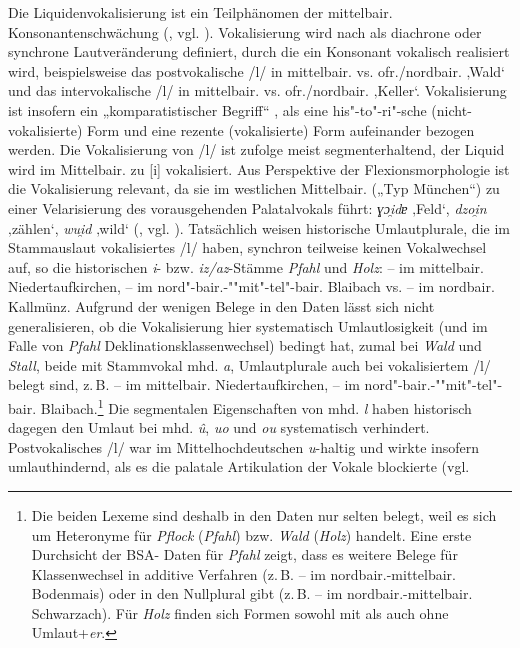 Die Liquidenvokalisierung ist ein Teilphänomen der mittelbair. Konsonantenschwächung (\citealt[49c6]{Kranzmayer1956}, vgl. \citealt[419]{Rowley1990b}). Vokalisierung wird nach \citet[1111]{Haas1983} als diachrone oder synchrone Lautveränderung definiert, durch die ein Konsonant vokalisch realisiert wird, beispielsweise das postvokalische /l/ in mittelbair.  vs. ofr./nordbair.  ‚Wald‘ und das intervokalische /l/ in mittelbair.  vs. ofr./nordbair.  ‚Keller‘. Vokalisierung ist insofern ein „komparatistischer Begriff“ \citep[1111]{Haas1983}, als eine his"-to"-ri"-sche (nicht-vokalisierte) Form und eine rezente (vokalisierte) Form aufeinander bezogen werden. Die Vokalisierung von /l/ ist \citet[1111]{Haas1983} zufolge meist segmenterhaltend, der Liquid wird im Mittelbair. zu [i] vokalisiert. Aus Perspektive der Flexionsmorphologie ist die Vokalisierung relevant, da sie im westlichen Mittelbair. („Typ München“) zu einer Velarisierung des vorausgehenden Palatalvokals führt: \textit{ɣɔi̯dɐ} ‚Feld‘, \textit{dzoi̯n} ‚zählen‘, \textit{wui̯d} ‚wild‘ (\citealt[1112]{Haas1983}, vgl. \citealt[Karte 4]{Kranzmayer1956}). Tatsächlich weisen historische Umlautplurale, die im Stammauslaut vokalisiertes /l/ haben, synchron teilweise keinen Vokalwechsel auf, so die historischen \textit{i}{}- bzw. \textit{iz/az}{}-Stämme \textit{Pfahl} und \textit{Holz}:  --  im mittelbair. Niedertaufkirchen,  --  im nord"-bair.-""mit"-tel"-bair. Blaibach vs.  --  im nordbair. Kallmünz. Aufgrund der wenigen Belege in den Daten lässt sich nicht generalisieren, ob die Vokalisierung hier systematisch Umlautlosigkeit (und im Falle von \textit{Pfahl} Deklinationsklassenwechsel) bedingt hat, zumal bei \textit{Wald} und \textit{Stall}, beide mit Stammvokal mhd. \textit{a}, Umlautplurale auch bei vokalisiertem /l/ belegt sind, z.\,B.  --  im mittelbair. Niedertaufkirchen,  --  im nord"-bair.-""mit"-tel"-bair. Blaibach.\footnote{Die beiden Lexeme sind deshalb in den Daten nur selten belegt, weil es sich um Heteronyme für \textit{Pflock} (\textit{Pfahl}) bzw. \textit{Wald} (\textit{Holz}) handelt. Eine erste Durchsicht der BSA- Daten für \textit{Pfahl} zeigt, dass es weitere Belege für Klassenwechsel in additive Verfahren (z.\,B.  --  im nordbair.-mittelbair. Bodenmais) oder in den Nullplural gibt (z.\,B.  --  im nordbair.-mittelbair. Schwarzach). Für {\textit{Holz} }{finden sich Formen sowohl mit als auch ohne Umlaut+}\textit{er}.} Die segmentalen Eigenschaften von mhd. \textit{l} haben historisch dagegen den Umlaut bei mhd. \textit{û}, \textit{uo} und \textit{ou} systematisch verhindert. Postvokalisches /l/ war im Mittelhochdeutschen \textit{u}{}-haltig und wirkte insofern umlauthindernd, als es die palatale Artikulation der Vokale blockierte (vgl. 